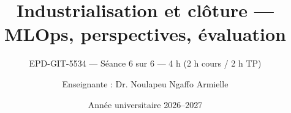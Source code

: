 
\title[EPD-GIT-5534 --- Séance 6]{Industrialisation et clôture --- MLOps, perspectives, évaluation}
\subtitle{EPD-GIT-5534 --- Séance 6 sur 6 --- 4 h (2 h cours / 2 h TP)}
\author{Enseignante : Dr. Noulapeu Ngaffo Armielle}
\date{Année universitaire 2026--2027}







